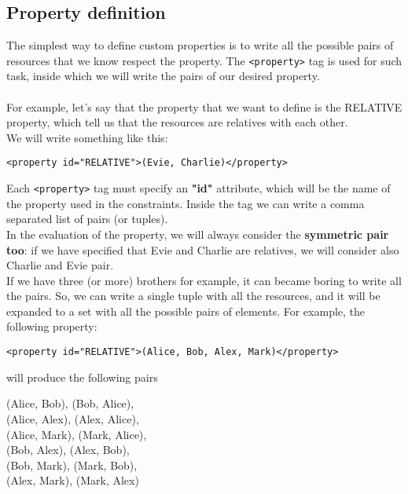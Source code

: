 \documentclass{article}
\newcommand*{\xml}[1]{\texttt{<#1>}}
\begin{document}
\subsection{Property definition}
The simplest way to define custom properties is to write all the possible pairs of resources that we know respect the property. The \xml{property} tag is used for such task, inside which we will write the pairs of our desired property. \\ 
\\
For example, let's say that the property that we want to define is the RELATIVE property, which tell us that the resources are relatives with each other. \\
We will write something like this:
\begin{lstlisting}
<property id="RELATIVE">(Evie, Charlie)</property>
\end{lstlisting}
Each \xml{property} tag must specify an \textbf{"id"} attribute, which will be the name of the property used in the constraints. Inside the tag we can write a comma separated list of pairs (or tuples).\\
In the evaluation of the property, we will always consider the \textbf{symmetric pair too}: if we have specified that Evie and Charlie are relatives, we will consider also Charlie and Evie pair.
\\
If we have three (or more) brothers for example, it can became boring to write all the pairs. So, we can write a single tuple with all the resources, and it will be expanded to a set with all the possible pairs of elements. For example, the following property: 
\begin{lstlisting}
<property id="RELATIVE">(Alice, Bob, Alex, Mark)</property>
\end{lstlisting}
will produce the following pairs
\begin{center}
        (Alice, Bob), (Bob, Alice),\\ 
        (Alice, Alex), (Alex, Alice), \\
        (Alice, Mark), (Mark, Alice),\\
        (Bob, Alex), (Alex, Bob),\\
        (Bob, Mark), (Mark, Bob),\\
        (Alex, Mark), (Mark, Alex)\\
\end{center}
\end{document}
